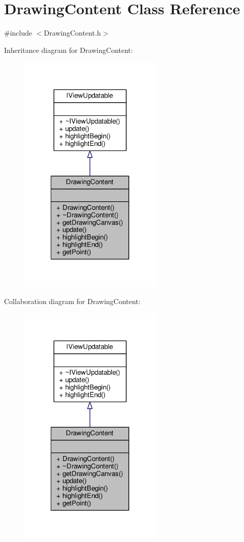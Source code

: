 \hypertarget{class_drawing_content}{\section{Drawing\-Content Class Reference}
\label{class_drawing_content}
}


{\ttfamily \#include $<$Drawing\-Content.\-h$>$}



Inheritance diagram for Drawing\-Content\-:\nopagebreak
\begin{figure}[H]
\begin{center}
\leavevmode
\includegraphics[width=194pt]{class_drawing_content__inherit__graph}
\end{center}
\end{figure}


Collaboration diagram for Drawing\-Content\-:
\nopagebreak
\begin{figure}[H]
\begin{center}
\leavevmode
\includegraphics[width=194pt]{class_drawing_content__coll__graph}
\end{center}
\end{figure}
